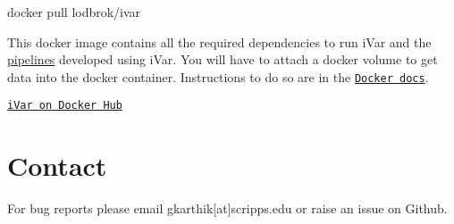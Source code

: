 \begin{DoxyCode}
docker pull lodbrok/ivar
\end{DoxyCode}


This docker image contains all the required dependencies to run i\+Var and the \mbox{\hyperlink{cookbookpage}{pipelines}} developed using i\+Var. You will have to attach a docker volume to get data into the docker container. Instructions to do so are in the \href{https://docs.docker.com/storage/volumes/}{\tt Docker docs}.

\href{https://hub.docker.com/r/lodbrok/ivar/}{\tt i\+Var on Docker Hub}\hypertarget{installpage_autotoc_md11}{}\section{Contact}\label{installpage_autotoc_md11}
For bug reports please email gkarthik\mbox{[}at\mbox{]}scripps.\+edu or raise an issue on Github. 